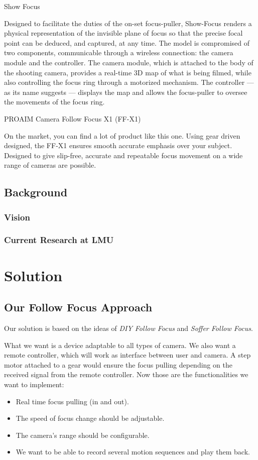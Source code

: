 \documentclass{sigchi}
\begin{document}
Show Focus

Designed to facilitate the duties of the on-set focus-puller, Show-Focus renders a physical representation of the invisible plane of focus so that the precise focal point can be deduced, and captured, at any time. The model is compromised of two components, communicable through a wireless connection: the camera module and the controller. The camera module, which is attached to the body of the shooting camera, provides a real-time 3D map of what is being filmed, while also controlling the focus ring through a motorized mechanism. The controller — as its name suggests — displays the map and allows the focus-puller to oversee the movements of the focus ring.

PROAIM Camera Follow Focus X1 (FF-X1)

On the market, you can find a lot of product like this one. Using gear driven designed, the FF-X1 ensures smooth accurate emphasis over your subject. Designed to give slip-free, accurate and repeatable focus movement on a wide range of cameras are possible.


\subsection{Background}

\subsubsection{Vision}

\subsubsection{Current Research at LMU}

\section{Solution}

\subsection{Our Follow Focus Approach}
Our solution is based on the ideas of \textit{DIY Follow Focus} and \textit{Soffer Follow Focus}.

What we want is a device adaptable to all types of camera. We also want a remote controller, which will work as interface between user and camera. A step motor attached to a gear would ensure the focus pulling depending on the received signal from the remote controller.
Now those are the functionalities we want to implement:
\begin{itemize}
  \item Real time focus pulling (in and out).
  \item The speed of focus change should be adjustable.
  \item The camera's range should be configurable.
  \item We want to be able to record several motion sequences and play them back.
\end{itemize}
\end{document}

